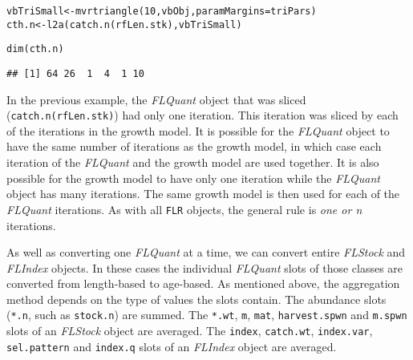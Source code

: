 \documentclass[a4paper,english,10pt]{article}\usepackage[]{graphicx}\usepackage[]{color}
\makeatletter
\newcommand{\hlnum}[1]{\textcolor[rgb]{0.2,0.2,0.2}{#1}}%
\newcommand{\hlstd}[1]{\textcolor[rgb]{0,0,0}{#1}}%
\newcommand{\hlkwb}[1]{\textcolor[rgb]{0.361,0.506,0.596}{#1}}%
\newcommand{\hlkwc}[1]{\textcolor[rgb]{0.361,0.506,0.596}{#1}}%
\newcommand{\hlkwd}[1]{\textcolor[rgb]{0.361,0.506,0.596}{#1}}%
\newenvironment{kframe}{%
 \def\at@end@of@kframe{}%
 \ifinner\ifhmode%
  \def\at@end@of@kframe{\end{minipage}}%
  \begin{minipage}{\columnwidth}%
 \fi\fi%
 \def\FrameCommand##1{\hskip\@totalleftmargin \hskip-\fboxsep
 \colorbox{shadecolor}{##1}\hskip-\fboxsep
     \hskip-\linewidth \hskip-\@totalleftmargin \hskip\columnwidth}%
 \MakeFramed {\advance\hsize-\width
   \@totalleftmargin\z@ \linewidth\hsize
   \@setminipage}}%
 {\par\unskip\endMakeFramed%
 \at@end@of@kframe}
\newenvironment{knitrout}{}{} %
\newcommand{\code}[1]{{\texttt{#1}}}
\newcommand{\pkg}[1]{{\texttt{#1}}}
\newcommand{\class}[1]{{\textit{#1}}}
\makeatother
\begin{document}
\begin{knitrout}
\color{fgcolor}\begin{kframe}
\begin{alltt}
\hlstd{vbTriSmall} \hlkwb{<-} \hlkwd{mvrtriangle}\hlstd{(}\hlnum{10}\hlstd{, vbObj,} \hlkwc{paramMargins}\hlstd{=triPars)}
\hlstd{cth.n} \hlkwb{<-} \hlkwd{l2a}\hlstd{(}\hlkwd{catch.n}\hlstd{(rfLen.stk), vbTriSmall)}
\end{alltt}
\end{kframe}
\end{knitrout}

\begin{knitrout}
\color{fgcolor}\begin{kframe}
\begin{alltt}
\hlkwd{dim}\hlstd{(cth.n)}
\end{alltt}
\begin{verbatim}
## [1] 64 26  1  4  1 10
\end{verbatim}
\end{kframe}
\end{knitrout}

In the previous example, the \class{FLQuant} object that was sliced (\code{catch.n(rfLen.stk)}) had only one iteration. This iteration was sliced by each of the iterations in the growth model. It is possible for the \class{FLQuant} object to have the same number of iterations as the growth model, in which case each iteration of the \class{FLQuant} and the growth model are used together. It is also possible for the growth model to have only one iteration while the \class{FLQuant} object has many iterations. The same growth model is then used for each of the \class{FLQuant} iterations. As with all \pkg{FLR} objects, the general rule is \emph{one or n} iterations.


As well as converting one \class{FLQuant} at a time, we can convert entire \class{FLStock} and \class{FLIndex} objects. In these cases the individual \class{FLQuant} slots of those classes are converted from length-based to age-based. As mentioned above, the aggregation method depends on the type of values the slots contain. The abundance slots (\code{*.n}, such as \code{stock.n}) are summed. The \code{*.wt}, \code{m}, \code{mat}, \code{harvest.spwn} and \code{m.spwn} slots of an \class{FLStock} object are averaged. The \code{index}, \code{catch.wt}, \code{index.var}, \code{sel.pattern} and \code{index.q} slots of an \class{FLIndex} object are averaged.
\end{document}
